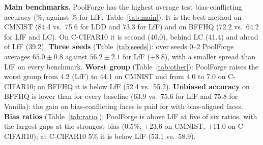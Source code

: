 \textbf{Main benchmarks.} PoolForge has the highest average test bias-conflicting accuracy (\PFavg\%, against
\LFFavg\% for LfF, Table~\ref{tab:main}). It is the best method on CMNIST (84.4 vs.\ 75.6 for LDD and 73.3 for LfF)
and on BFFHQ (72.2 vs.\ 64.2 for LfF and LC). On C-CIFAR10 it is second (40.0), behind LC (41.4) and ahead of LfF
(39.2). \textbf{Three seeds} (Table~\ref{tab:seeds}): over seeds 0--2 PoolForge averages $65.0\pm0.8$ against
$56.2\pm2.1$ for LfF ($+8.8$), with a smaller spread than LfF on every benchmark.
\textbf{Worst group} (Table~\ref{tab:other}): PoolForge raises the worst group from 4.2 (LfF) to 44.1 on CMNIST and
from 4.0 to 7.0 on C-CIFAR10; on BFFHQ it is below LfF (52.4 vs.\ 55.2).
\textbf{Unbiased accuracy} on BFFHQ is lower than for every baseline (63.9 vs.\ 75.6 for LfF and 75.8 for Vanilla):
the gain on bias-conflicting faces is paid for with bias-aligned faces.
\textbf{Bias ratios} (Table~\ref{tab:ratio}): PoolForge is above LfF at five of six ratios, with the largest gaps
at the strongest bias (0.5\%: $+23.6$ on CMNIST, $+11.0$ on C-CIFAR10); at C-CIFAR10 5\% it is below LfF
(53.1 vs.\ 58.9).
